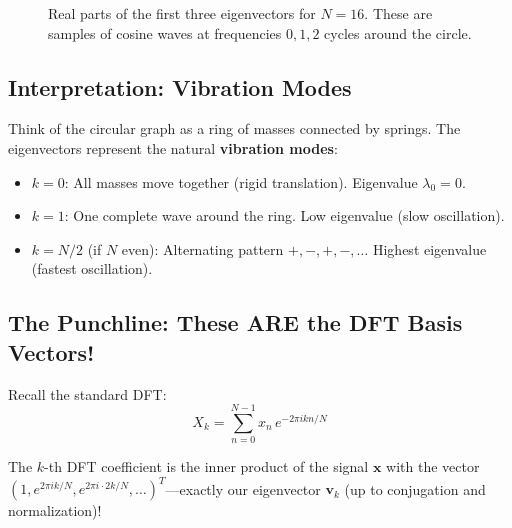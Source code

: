 \begin{notechapter}
\begin{figure}[H]

\caption{Real parts of the first three eigenvectors for $N=16$. These 
         are samples of cosine waves at frequencies $0, 1, 2$ cycles 
         around the circle.}
\end{figure}

\subsection{Interpretation: Vibration Modes}

Think of the circular graph as a ring of masses connected by springs. 
The eigenvectors represent the natural \textbf{vibration modes}:

\begin{itemize}
\item $k = 0$: All masses move together (rigid translation). 
      Eigenvalue $\lambda_0 = 0$.
\item $k = 1$: One complete wave around the ring. Low eigenvalue 
      (slow oscillation).
\item $k = N/2$ (if $N$ even): Alternating pattern $+,-,+,-,\ldots$ 
      Highest eigenvalue (fastest oscillation).
\end{itemize}

\subsection{The Punchline: These ARE the DFT Basis Vectors!}

Recall the standard DFT:
\begin{equation}
X_k = \sum_{n=0}^{N-1} x_n \, e^{-2\pi i kn/N}
\end{equation}

The $k$-th DFT coefficient is the inner product of the signal 
$\mathbf{x}$ with the vector 
$(1, e^{2\pi i k/N}, e^{2\pi i \cdot 2k/N}, \ldots)^T$---exactly our 
eigenvector $\mathbf{v}_k$ (up to conjugation and normalization)!

\begin{center}
\end{center}


\end{notechapter}
